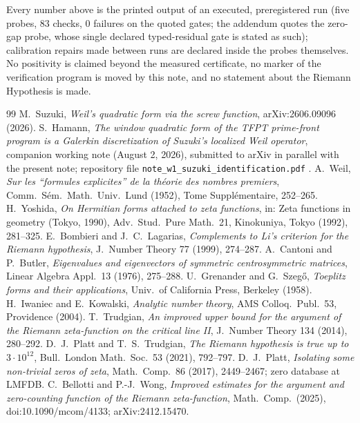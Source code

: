 \documentclass[11pt,a4paper]{article}
\theoremstyle{remark}
\begin{document}
Every number above is the printed output of an executed, preregistered
run (five probes, $83$ checks, $0$ failures on the quoted gates; the
addendum quotes the zero-gap probe, whose single declared
typed-residual gate is stated as such);
calibration repairs made between runs are declared inside the probes
themselves.  No positivity is claimed beyond the measured certificate,
no marker of the verification program is moved by this note, and no
statement about the Riemann Hypothesis is made.

\small
\begin{thebibliography}{99}
 M.~Suzuki,
\emph{Weil's quadratic form via the screw function},
arXiv:2606.09096 (2026).
 S.~Hamann,
\emph{The window quadratic form of the TFPT prime-front program is a
Galerkin discretization of Suzuki's localized Weil operator},
companion working note (August 2, 2026), submitted to arXiv in
parallel with the present note; repository file
\texttt{note\_w1\_suzuki\_identification.pdf} \cite{TFPT}.
 A.~Weil,
\emph{Sur les ``formules explicites'' de la th\'eorie des nombres
premiers}, Comm.\ S\'em.\ Math.\ Univ.\ Lund (1952), Tome
Suppl\'ementaire, 252--265.
 H.~Yoshida,
\emph{On Hermitian forms attached to zeta functions}, in: Zeta
functions in geometry (Tokyo, 1990), Adv.\ Stud.\ Pure Math.\ 21,
Kinokuniya, Tokyo (1992), 281--325.
 E.~Bombieri and J.~C.~Lagarias,
\emph{Complements to Li's criterion for the Riemann hypothesis},
J.\ Number Theory 77 (1999), 274--287.
 A.~Cantoni and P.~Butler,
\emph{Eigenvalues and eigenvectors of symmetric centrosymmetric
matrices}, Linear Algebra Appl.\ 13 (1976), 275--288.
 U.~Grenander and G.~Szeg\H o,
\emph{Toeplitz forms and their applications},
Univ.\ of California Press, Berkeley (1958).
 H.~Iwaniec and E.~Kowalski,
\emph{Analytic number theory}, AMS Colloq.\ Publ.\ 53, Providence
(2004).
 T.~Trudgian,
\emph{An improved upper bound for the argument of the Riemann
zeta-function on the critical line II},
J.\ Number Theory 134 (2014), 280--292.
 D.~J.~Platt and T.~S.~Trudgian,
\emph{The Riemann hypothesis is true up to $3\cdot10^{12}$},
Bull.\ London Math.\ Soc.\ 53 (2021), 792--797.
 D.~J.~Platt,
\emph{Isolating some non-trivial zeros of zeta},
Math.\ Comp.\ 86 (2017), 2449--2467; zero database at LMFDB.
 C.~Bellotti and P.-J.~Wong,
\emph{Improved estimates for the argument and zero-counting function
of the Riemann zeta-function},
Math.\ Comp.\ (2025), doi:10.1090/mcom/4133; arXiv:2412.15470.

\end{thebibliography}
\end{document}
